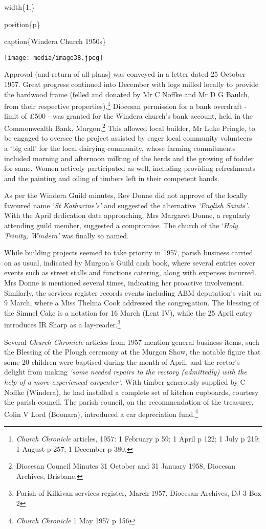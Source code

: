 width\{1.\}

position\{p\}

caption\{Windera Church 1950s\}

\texttt{[image: media/image38.jpeg]}

Approval (and return of all plans) was conveyed in a letter dated 25 October 1957. Great progress continued into December with logs milled locally to provide the hardwood frame (felled and donated by Mr C Noffke and Mr D G Baulch, from their respective properties).\footnote{\emph{Church Chronicle} articles, 1957: 1 February p 59; 1 April p 122; 1 July p 219; 1 August p 257; 1 December p 380.} Diocesan permission for a bank overdraft - limit of £500 - was granted for the Windera church's bank account, held in the Commonwealth Bank, Murgon.\footnote{Diocesan Council Minutes 31 October and 31 January 1958, Diocesan Archives, Brisbane.} This allowed local builder, Mr Luke Pringle, to be engaged to oversee the project assisted by eager local community volunteers -- a `big call' for the local dairying community, whose farming commitments included morning and afternoon milking of the herds and the growing of fodder for same. Women actively participated as well, including providing refreshments and the painting and oiling of timbers left in their competent hands.

As per the Windera Guild minutes, Rev Donne did not approve of the locally favoured name `\emph{St Katharine's'} and suggested the alternative \emph{`English Saints'}. With the April dedication date approaching, Mrs Margaret Donne, a regularly attending guild member, suggested a compromise. The church of the `\emph{Holy Trinity, Windera'} was finally so named.

While building projects seemed to take priority in 1957, parish business carried on as usual, indicated by Murgon's Guild cash book, where several entries cover events such as street stalls and functions catering, along with expenses incurred. Mrs Donne is mentioned several times, indicating her proactive involvement. Similarly, the services register records events including ABM deputation's visit on 9 March, where a Miss Thelma Cook addressed the congregation. The blessing of the Simnel Cake is a notation for 16 March (Lent IV), while the 25 April entry introduces IR Sharp as a lay-reader.\footnote{Parish of Kilkivan services register, March 1957, Diocesan Archives, DJ 3 Box 2}

Several \emph{Church Chronicle} articles from 1957 mention general business items, such the Blessing of the Plough ceremony at the Murgon Show, the notable figure that some 20 children were baptised during the month of April, and the rector's delight from making \emph{`some needed repairs to the rectory (admittedly) with the help of a more experienced carpenter'}. With timber generously supplied by C Noffke (Windera), he had installed a complete set of kitchen cupboards, courtesy the parish council. The parish council, on the recommendation of the treasurer, Colin V Lord (Boonara), introduced a car depreciation fund.\footnote{\emph{Church Chronicle} 1 May 1957 p 156}

